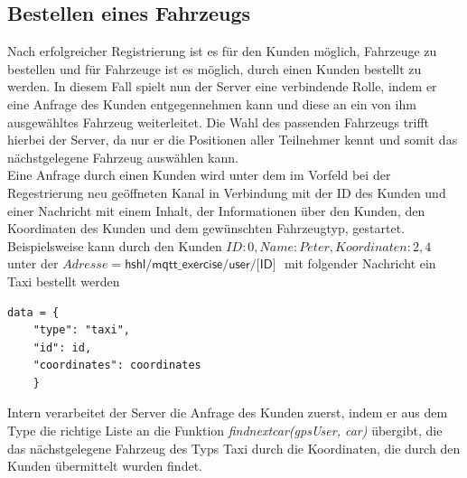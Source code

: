 \documentclass[conference]{IEEEtran}
\begin{document}
\subsection{Bestellen eines Fahrzeugs}
Nach erfolgreicher Registrierung ist es für den Kunden möglich, Fahrzeuge zu bestellen und für Fahrzeuge ist es möglich, durch einen Kunden bestellt zu werden. In diesem Fall spielt nun der Server eine verbindende Rolle, indem er eine Anfrage des Kunden entgegennehmen kann und diese an ein von ihm ausgewähltes Fahrzeug weiterleitet. Die Wahl des passenden Fahrzeugs trifft hierbei der Server, da nur er die Positionen aller Teilnehmer kennt und somit das nächstgelegene Fahrzeug auswählen kann.\\ 
Eine Anfrage durch einen Kunden wird unter dem im Vorfeld bei der Regestrierung neu geöffneten Kanal in Verbindung mit der ID des Kunden und einer Nachricht mit einem Inhalt, der Informationen über den Kunden, den Koordinaten des Kunden und dem gewünschten Fahrzeugtyp, gestartet. Beispielsweise kann durch den Kunden $ID: 0, Name: Peter, Koordinaten: 2,4$ unter der $Adresse=\textsf{hshl/mqtt\_exercise/user/[ID] }$ mit folgender Nachricht ein Taxi bestellt werden \begin{lstlisting}
data = {
	"type": "taxi",
    "id": id,
    "coordinates": coordinates
    }
\end{lstlisting}
Intern verarbeitet der Server die Anfrage des Kunden zuerst, indem er aus dem Type die richtige Liste an die Funktion \textit{findnextcar(gpsUser, car)} übergibt, die das nächstgelegene Fahrzeug des Typs Taxi durch die Koordinaten, die durch den Kunden übermittelt wurden findet.
\end{document}
